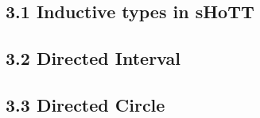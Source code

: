 \documentclass{article}
\theoremstyle{named}
\theoremstyle{remark}
\theoremstyle{definition}
\begin{document}
\subsection*{3.1 Inductive types in sHoTT}


\subsection*{3.2 Directed Interval}


\subsection*{3.3 Directed Circle}




\end{document}
